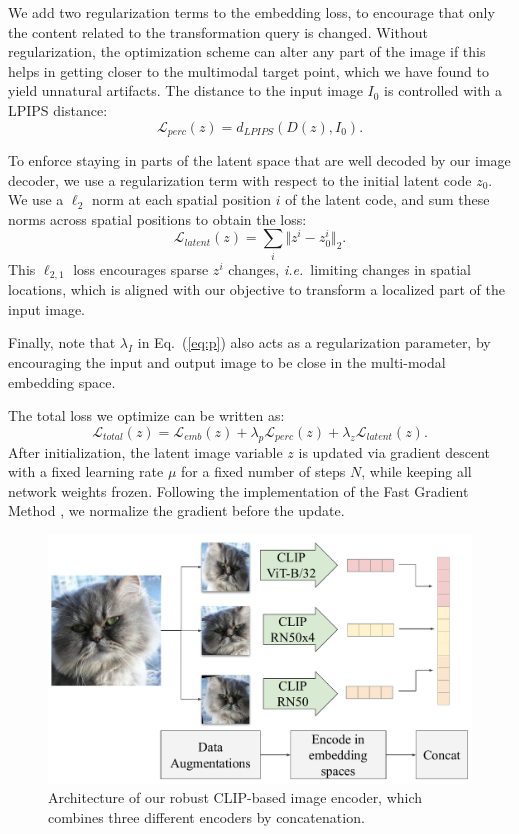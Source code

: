 We add two regularization terms to the embedding loss, to encourage that only the content related to the transformation query is changed. 
Without regularization, the optimization scheme can alter any part of the image if this helps in getting closer to the multimodal target point, which we have found to yield unnatural artifacts. 
The distance to the input image $I_0$ is controlled with a LPIPS distance:
\begin{equation}
\mathcal{L}_{perc}(z) = d_{LPIPS} (D(z), I_0). 
\end{equation}

To enforce staying in parts of the latent space that are well decoded by our image decoder, we use a regularization term with respect to the initial latent code $z_0$. 
We use a $\ell_2$ norm at each spatial position $i$ of the latent code, and sum these norms across  spatial positions to obtain the loss: %
\begin{equation}
\mathcal{L}_{latent}(z) = \sum_i \Vert z^i - z_0^i \Vert_2.
\end{equation}
This $\ell_{2,1}$ loss encourages sparse $z^i$ changes, \textit{i.e.}\ limiting changes in spatial locations, which is aligned with our objective to transform a localized part of the input image.

Finally, note that  $\lambda_I$ in Eq.\ (\ref{eq:p}) also acts as a regularization parameter, by encouraging  the input  and output image to be close in the multi-modal embedding space.

The total loss we optimize can be written as:
\begin{equation}
\mathcal{L}_{total}(z) = \mathcal{L}_{emb}(z) + \lambda_p \mathcal{L}_{perc}(z)  + \lambda_z \mathcal{L}_{latent}(z).
\end{equation}
After initialization, 
the latent image variable $z$ is updated via gradient descent with a fixed learning rate $\mu$ for a fixed number of steps $N$, while keeping all network weights frozen. Following the implementation of the Fast Gradient Method \cite{dong2018boosting}, we normalize the gradient before the update.




\begin{figure}
    \centering
    \includegraphics[width=\linewidth]{images/flexit/assets/clips.pdf}
    \caption{
    Architecture of our robust CLIP-based image encoder, which combines three different  encoders by concatenation.}
    \label{fig:clips}
\end{figure}


